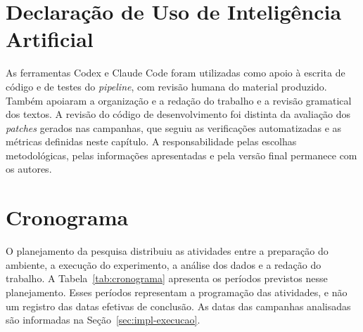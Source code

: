 \section{Declaração de Uso de Inteligência Artificial}
\label{sec:met-ia}

As ferramentas Codex e Claude Code foram utilizadas como apoio à escrita de código e de testes do \textit{pipeline}, com revisão humana do material produzido. Também apoiaram a organização e a redação do trabalho e a revisão gramatical dos textos. A revisão do código de desenvolvimento foi distinta da avaliação dos \textit{patches} gerados nas campanhas, que seguiu as verificações automatizadas e as métricas definidas neste capítulo. A responsabilidade pelas escolhas metodológicas, pelas informações apresentadas e pela versão final permanece com os autores.

\section{Cronograma}
\label{sec:met-cronograma}

O planejamento da pesquisa distribuiu as atividades entre a preparação do ambiente, a execução do experimento, a análise dos dados e a redação do trabalho. A Tabela~\ref{tab:cronograma} apresenta os períodos previstos nesse planejamento. Esses períodos representam a programação das atividades, e não um registro das datas efetivas de conclusão. As datas das campanhas analisadas são informadas na Seção~\ref{sec:impl-execucao}.

